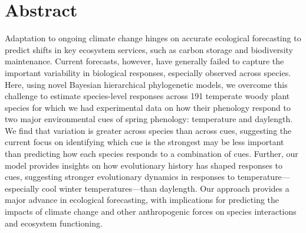 \documentclass[11pt]{article}
\begin{document}
\clearpage




\section*{Abstract}
Adaptation to ongoing climate change hinges on accurate ecological forecasting to predict shifts in key ecosystem services, such as carbon storage and biodiversity maintenance. Current forecasts, however, have generally failed to capture the important variability in biological responses, especially observed across species.  Here, using novel Bayesian hierarchical phylogenetic models, we overcome this challenge to estimate species-level responses across 191 temperate woody plant species for which we had experimental data on how their phenology respond
to two major environmental cues of spring phenology: temperature and daylength. We find that variation is greater across species than across cues, suggesting the current focus on identifying which cue is the strongest may be less important than predicting how each species responds to a combination of cues. Further, our model provides insights on how evolutionary history has shaped responses to cues, suggesting stronger evolutionary dynamics in responses to temperature---especially cool winter temperatures---than daylength. Our approach provides a major advance in ecological forecasting, with implications for predicting the impacts of climate change and other anthropogenic forces on species interactions and ecosystem functioning. 
\clearpage





\linenumbers
\end{document}
